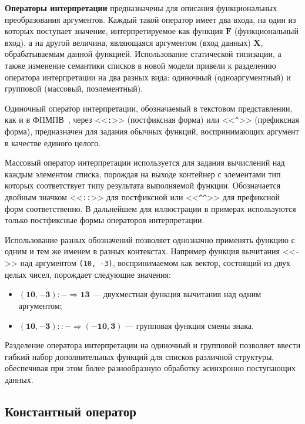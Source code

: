 \textbf{Операторы интерпретации} предназначены для описания функциональных преобразования аргументов. Каждый такой оператор имеет два входа, на один из которых поступает значение, интерпретируемое как функция $\mathbf{F}$ (функциональный вход), а на другой величина, являющаяся аргументом (вход данных) $\mathbf{X}$, обрабатываемым данной функцией. Использование статической типизации, а также изменение семантики списков в новой модели привели к разделению оператора интерпретации на два разных вида: одиночный (одноаргументный) и групповой (массовый, поэлементный).

Одиночный оператор интерпретации, обозначаемый в текстовом представлении, как и в ФПМПВ~\cite{legalov2005}, через <<\texttt{:}>> (постфиксная форма) или <<\texttt{\textasciicircum}>> (префиксная форма), предназначен для задания обычных функций, воспринимающих аргумент в качестве единого целого.

Массовый оператор интерпретации используется для задания вычислений над каждым элементом списка, порождая на выходе контейнер с элементами тип которых  соответствует типу результата выполняемой функции. Обозначается двойным значком <<\texttt{::}>> для постфиксной или <<\texttt{\textasciicircum\textasciicircum}>>  для префиксной форм соответственно. В дальнейшем для иллюстрации в примерах используются только постфиксные формы операторов интерпретации.

Использование разных обозначений позволяет однозначно применять функцию с одним и тем же именем в разных контекстах. Например функция вычитания <<\texttt{-}>> над аргументом \texttt{(10, -3)}, воспринимаемом как вектор, состоящий из двух целых чисел, порождает следующие значения:
\begin{itemize}
	\item $\mathbf{(10, -3):- \Rightarrow 13}$ --- двухместная функция вычитания над одним аргументом;
	\item $\mathbf{(10, -3)::- \Rightarrow (-10, 3)}$ --- групповая функция смены знака.
\end{itemize}

Разделение оператора интерпретации на одиночный и групповой позволяет ввести гибкий набор дополнительных функций для списков различной структуры, обеспечивая при этом более разнообразную обработку асинхронно поступающих данных.

\subsection{Константный оператор}

